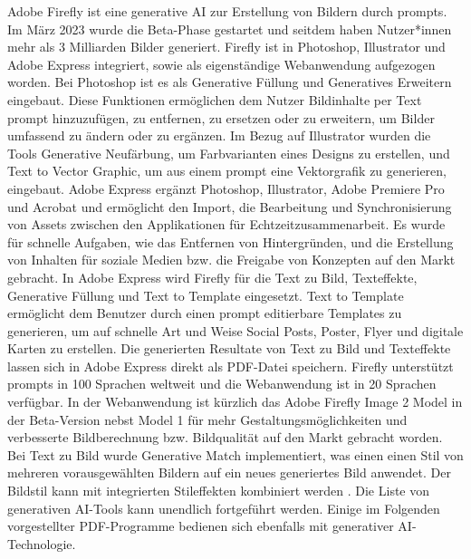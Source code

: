 Adobe Firefly ist eine generative AI zur Erstellung von Bildern durch prompts. Im März 2023 wurde die Beta-Phase gestartet und seitdem haben Nutzer*innen mehr als 3 Milliarden Bilder generiert. Firefly ist in Photoshop, Illustrator und Adobe Express integriert, sowie als eigenständige Webanwendung aufgezogen worden. Bei Photoshop ist es als Generative Füllung und Generatives Erweitern eingebaut. Diese Funktionen ermöglichen dem Nutzer Bildinhalte per Text prompt hinzuzufügen, zu entfernen, zu ersetzen oder zu erweitern, um Bilder umfassend zu ändern oder zu ergänzen. Im Bezug auf Illustrator wurden die Tools Generative Neufärbung, um Farbvarianten eines Designs zu erstellen, und Text to Vector Graphic, um aus einem prompt eine Vektorgrafik zu generieren, eingebaut. Adobe Express ergänzt Photoshop, Illustrator, Adobe Premiere Pro und Acrobat und ermöglicht den Import, die Bearbeitung und Synchronisierung von Assets zwischen den Applikationen für Echtzeitzusammenarbeit. Es wurde für schnelle Aufgaben, wie das Entfernen von Hintergründen, und die Erstellung von Inhalten für soziale Medien bzw. die Freigabe von Konzepten auf den Markt gebracht. In Adobe Express wird Firefly für die Text zu Bild, Texteffekte, Generative Füllung und Text to Template eingesetzt. Text to Template ermöglicht dem Benutzer durch einen prompt editierbare Templates zu generieren, um auf schnelle Art und Weise Social Posts, Poster, Flyer und digitale Karten zu erstellen. Die generierten Resultate von Text zu Bild und Texteffekte lassen sich in Adobe Express direkt als PDF-Datei speichern. Firefly unterstützt prompts in 100 Sprachen weltweit und die Webanwendung ist in 20 Sprachen verfügbar. In der Webanwendung ist kürzlich das Adobe Firefly Image 2 Model in der Beta-Version nebst Model 1 für mehr Gestaltungsmöglichkeiten und verbesserte Bildberechnung bzw. Bildqualität auf den Markt gebracht worden. Bei Text zu Bild wurde Generative Match implementiert, was einen einen Stil von mehreren vorausgewählten Bildern auf ein neues generiertes Bild anwendet. Der Bildstil kann mit integrierten Stileffekten kombiniert werden \cite{adobe-firefly}. Die Liste von generativen AI-Tools kann unendlich fortgeführt werden. Einige im Folgenden vorgestellter PDF-Programme bedienen sich ebenfalls mit generativer AI-Technologie.     